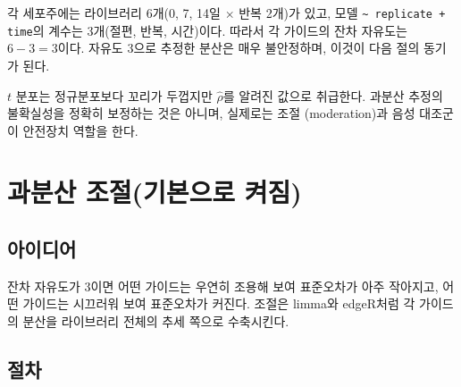 \documentclass[11pt]{article}
\begin{document}
\begin{example}
각 세포주에는 라이브러리 6개(0, 7, 14일 $\times$ 반복 2개)가 있고,
모델 \texttt{\textasciitilde{} replicate + time}의 계수는 3개(절편, 반복,
시간)이다. 따라서 각 가이드의 잔차 자유도는 $6-3=3$이다. 자유도 3으로 추정한
분산은 매우 불안정하며, 이것이 다음 절의 동기가 된다.
\end{example}

$t$ 분포는 정규분포보다 꼬리가 두껍지만 $\hat\rho$를 알려진 값으로 취급한다.
과분산 추정의 불확실성을 정확히 보정하는 것은 아니며, 실제로는 조절
(moderation)과 음성 대조군이 안전장치 역할을 한다.

\section{과분산 조절(기본으로 켜짐)}

\subsection{아이디어}

잔차 자유도가 3이면 어떤 가이드는 우연히 조용해 보여 표준오차가 아주 작아지고,
어떤 가이드는 시끄러워 보여 표준오차가 커진다. 조절은 limma와 edgeR처럼 각
가이드의 분산을 라이브러리 전체의 추세 쪽으로 수축시킨다.

\subsection{절차}
\end{document}
